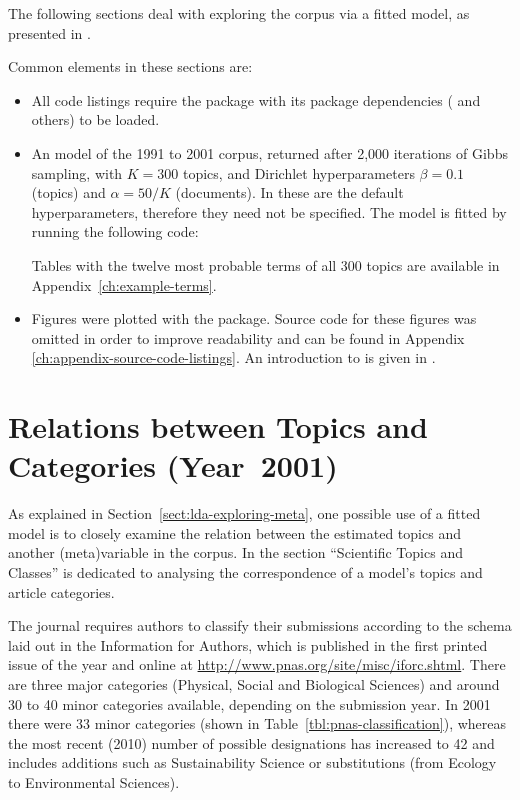 The following sections deal with exploring the  corpus via a fitted  model, as presented in \citet[page~5232]{Griffiths2004}. 

Common elements in these sections are:
\begin{itemize}
\item All code listings require the package  with its package dependencies ( and others) to be loaded.
 \item An  model of the 1991 to 2001  corpus, returned after 2,000 iterations of Gibbs sampling, with $K=300$ topics, and Dirichlet hyperparameters $\beta=0.1$ (topics) and $\alpha=50/K$ (documents). In  these are the default hyperparameters, therefore they need not be specified. The  model is fitted by running the following  code:

 Tables with the twelve most probable terms of all 300 topics are available in Appendix~\ref{ch:example-terms}.

\item Figures were plotted with the  package. Source code for these figures was omitted in order to improve readability and can be found in Appendix \ref{ch:appendix-source-code-listings}. An introduction to  is given in \citet{Sarkar2008}. 

\end{itemize}

\section{Relations between Topics and Categories (Year~2001)}
\label{sect:classification-2001}

As explained in Section~\ref{sect:lda-exploring-meta}, one possible use of a fitted model is to closely examine the relation between the estimated topics and another (meta)variable in the corpus. In  the section ``Scientific Topics and Classes'' is dedicated to analysing the correspondence of a model's topics and  article categories.

The  journal requires authors to classify their submissions according to the schema laid out in the Information for Authors, which is published in the first printed issue of the year and online at \url{http://www.pnas.org/site/misc/iforc.shtml}. There are three major categories (Physical, Social and Biological Sciences) and around 30 to 40 minor categories available, depending on the submission year. In 2001 there were 33 minor categories (shown in Table~\ref{tbl:pnas-classification}), whereas the most recent (2010) number of possible designations has increased to 42 and includes additions such as Sustainability Science or substitutions (from Ecology to Environmental Sciences).


